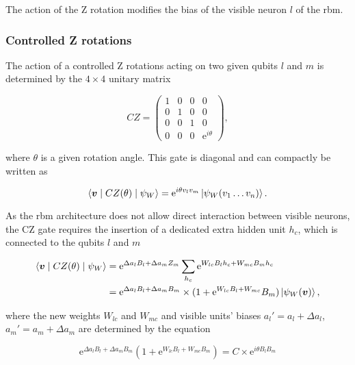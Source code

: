 The action of the Z rotation modifies the bias of the visible neuron $l$ of the \gls{rbm}.

\subsubsection{Controlled Z rotations}
The action of a controlled Z rotations acting on two given qubits $l$ and $m$ is determined by
the $4\times4$ unitary matrix

\begin{equation}
    CZ =
    \begin{pmatrix}
        1 & 0 & 0 & 0 \\
        0 & 1 & 0 & 0 \\
        0 & 0 & 1 & 0 \\
        0 & 0 & 0 & \mathrm{e}^{i\theta}
    \end{pmatrix},
\end{equation}

where $\theta$ is a given rotation angle. This gate is diagonal and can compactly be written as

\begin{equation}
    \langle \bm{v} \mid CZ(\theta) \mid \psi_{W}  \rangle = 
    \mathrm{e}^{i\theta v_{l}v_{m}}\Ket{\psi_{W}(v_{1} \dots v_{n})}.
\end{equation}

As the \gls{rbm} architecture does not allow direct interaction between visible neurons, the CZ gate
requires the insertion of a dedicated extra hidden unit $h_{c}$, which is connected
to the qubits $l$ and $m$

\begin{align}
    \langle \bm{v} \mid CZ(\theta) \mid \psi_{W}  \rangle &= 
    \mathrm{e}^{\Delta a_{l} B_{l} + \Delta a_{m} Z_{m}} \sum_{h_{c}}\mathrm{e}^{W_{lc} B_{l} h_{c} + W_{mc} B_{m} h_{c}} \\
    &= \mathrm{e}^{\Delta a_{l} B_{l} + \Delta a_{m} B_{m}} \times (1 + \mathrm{e}^{W_{lc} B_{l} + W_{mc}} B_{m}) \Ket{\psi_{W}(\bm{v})},
\end{align}

where the new weights $W_{lc}$ and $W_{mc}$ and visible units' biases $a_{l}\prime= a_{l} + \Delta a_{l}$,
$a_{m}\prime= a_{m} + \Delta a_{m}$ are determined by the equation

\begin{equation}
   \mathrm{e}^{\Delta a_{l} B_{l} + \Delta a_{m} B_{m}}(1 + \mathrm{e}^{W_{lc} B_{l} + W_{mc} B_{m}}) = C \times \mathrm{e}^{i \theta B_{l} B_{m}}
\end{equation}

